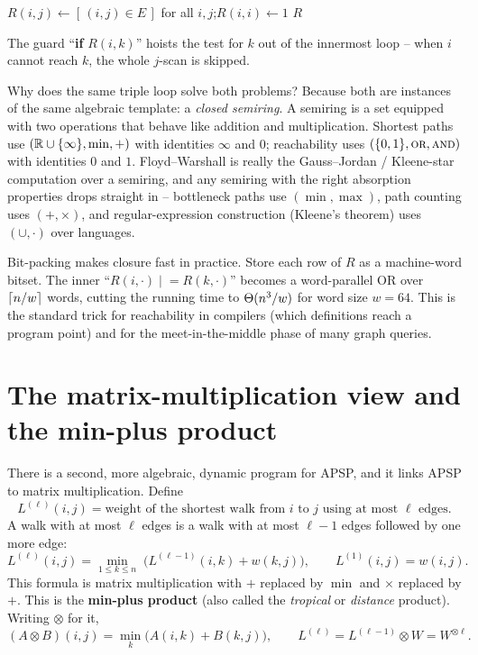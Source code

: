 \begin{algorithm}[H]
\caption{Warshall transitive closure}
\label{ch09:alg-warshall}
\DontPrintSemicolon
$R(i,j)\leftarrow [\,(i,j)\in E\,]$ for all $i,j$;\quad $R(i,i)\leftarrow 1$\;
\Return $R$\;
\end{algorithm}

The guard ``\textbf{if} $R(i,k)$'' hoists the test for $k$ out of the innermost loop -- when $i$ cannot
reach $k$, the whole $j$-scan is skipped.

\begin{whybox}
Why does the same triple loop solve both problems? Because both are instances of the same algebraic
template: a \emph{closed semiring}. A semiring is a set equipped with two operations that behave like addition and multiplication. Shortest paths use $(\mathbb{R}\cup\{\infty\},\min,+)$ with identities
$\infty$ and $0$; reachability uses $(\{0,1\},\textsc{or},\textsc{and})$ with identities $0$ and $1$.
Floyd--Warshall is really the Gauss--Jordan / Kleene-star computation over a semiring, and any semiring
with the right absorption properties drops straight in -- bottleneck paths use $(\min,\max)$, path
counting uses $(+,\times)$, and regular-expression construction (Kleene's theorem) uses $(\cup,\cdot)$
over languages.
\end{whybox}

\begin{applicationbox}
Bit-packing makes closure fast in practice. Store each row of $R$ as a machine-word bitset. The inner
``$R(i,\cdot)\mathrel{|}=R(k,\cdot)$'' becomes a word-parallel OR over $\lceil n/w\rceil$ words, cutting the
running time to $\Theta(n^3/w)$ for word size $w=64$. This is the standard trick for reachability in
compilers (which definitions reach a program point) and for the meet-in-the-middle phase of many graph
queries.
\end{applicationbox}

\section{The matrix-multiplication view and the min-plus product}
\label{ch09:minplus}

There is a second, more algebraic, dynamic program for APSP, and it links APSP to matrix multiplication. Define
\[
  L^{(\ell)}(i,j) = \text{weight of the shortest walk from } i \text{ to } j \text{ using at most } \ell \text{ edges.}
\]
A walk with at most $\ell$ edges is a walk with at most $\ell-1$ edges followed by one more edge:
\[
  L^{(\ell)}(i,j) = \min_{1\le k\le n}\;\Big(L^{(\ell-1)}(i,k) + w(k,j)\Big),
  \qquad L^{(1)}(i,j)=w(i,j).
\]
This formula is matrix multiplication with $+$ replaced by $\min$ and $\times$ replaced by
$+$. This is the \textbf{min-plus product} (also called the \emph{tropical} or \emph{distance} product).
Writing $\otimes$ for it,
\[
  (A\otimes B)(i,j) = \min_{k}\big(A(i,k)+B(k,j)\big),
  \qquad L^{(\ell)} = L^{(\ell-1)}\otimes W = W^{\otimes \ell}.
\]

